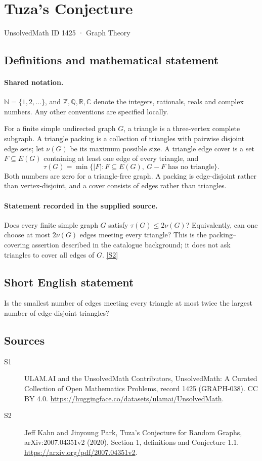 \documentclass[11pt]{article}
\newcommand{\sref}[2]{\hyperlink{source:#1:#2}{[S#2]}}
\begin{document}
\setcounter{section}{1424}
\section{Tuza's Conjecture}\label{1425}
{\small\sffamily UnsolvedMath ID 1425 · Graph Theory}
\subsection{Definitions and mathematical statement}

\paragraph{Shared notation.}$\mathbb N=\{1,2,\ldots\}$, and $\mathbb Z,\mathbb Q,\mathbb R,\mathbb C$ denote the integers, rationals, reals and complex numbers. Any other conventions are specified locally.


For a finite simple undirected graph $G$, a triangle is a three-vertex complete subgraph. A triangle packing is a collection of triangles with pairwise disjoint edge sets; let $\nu(G)$ be its maximum possible size. A triangle edge cover is a set $F\subseteq E(G)$ containing at least one edge of every triangle, and
\[
 \tau(G)=\min\{|F|:F\subseteq E(G),\ G-F\text{ has no triangle}\}.
\]
Both numbers are zero for a triangle-free graph. A packing is edge-disjoint rather than vertex-disjoint, and a cover consists of edges rather than triangles.
\paragraph{Statement recorded in the supplied source.}
Does every finite simple graph $G$ satisfy $\tau(G)\le2\nu(G)$? Equivalently, can one choose at most $2\nu(G)$ edges meeting every triangle? This is the packing--covering assertion described in the catalogue background; it does not ask triangles to cover all edges of $G$. \sref{1425}{2}
\subsection{Short English statement}
Is the smallest number of edges meeting every triangle at most twice the largest number of edge-disjoint triangles?
\subsection{Sources}
\begin{description}
\item[\hypertarget{source:1425:1}{S1}] ULAM.AI and the UnsolvedMath Contributors, UnsolvedMath: A Curated Collection of Open Mathematics Problems, record 1425 (GRAPH-038). CC BY 4.0. \url{https://huggingface.co/datasets/ulamai/UnsolvedMath}.
\item[\hypertarget{source:1425:2}{S2}] Jeff Kahn and Jinyoung Park, Tuza’s Conjecture for Random Graphs, arXiv:2007.04351v2 (2020), Section 1, definitions and Conjecture 1.1. \url{https://arxiv.org/pdf/2007.04351v2}.
\end{description}
\label{end:1425}
\end{document}
